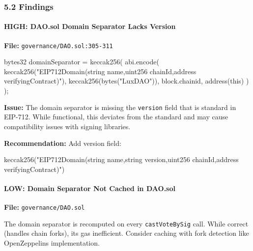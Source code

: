 \documentclass[
]{article}
\newenvironment{Shaded}{}{}
\newcommand{\NormalTok}[1]{#1}
\begin{document}
\subsubsection{5.2 Findings}\label{52-findings}

\paragraph{HIGH: DAO.sol Domain Separator Lacks
Version}\label{high-daosol-domain-separator-lacks-version}

\textbf{File:} \texttt{governance/DAO.sol:305-311}

\begin{Shaded}
\begin{Highlighting}[]
\NormalTok{bytes32 domainSeparator = keccak256(}
\NormalTok{    abi.encode(}
\NormalTok{        keccak256("EIP712Domain(string name,uint256 chainId,address verifyingContract)"),}
\NormalTok{        keccak256(bytes("LuxDAO")),}
\NormalTok{        block.chainid,}
\NormalTok{        address(this)}
\NormalTok{    )}
\NormalTok{);}
\end{Highlighting}
\end{Shaded}

\textbf{Issue:} The domain separator is missing the \texttt{version}
field that is standard in EIP-712. While functional, this deviates from
the standard and may cause compatibility issues with signing libraries.

\textbf{Recommendation:} Add version field:

\begin{Shaded}
\begin{Highlighting}[]
\NormalTok{keccak256("EIP712Domain(string name,string version,uint256 chainId,address verifyingContract)")}
\end{Highlighting}
\end{Shaded}

\paragraph{LOW: Domain Separator Not Cached in
DAO.sol}\label{low-domain-separator-not-cached-in-daosol}

\textbf{File:} \texttt{governance/DAO.sol}

The domain separator is recomputed on every \texttt{castVoteBySig} call.
While correct (handles chain forks), it\textquotesingle s gas
inefficient. Consider caching with fork detection like
OpenZeppelin\textquotesingle s implementation.
\end{document}
